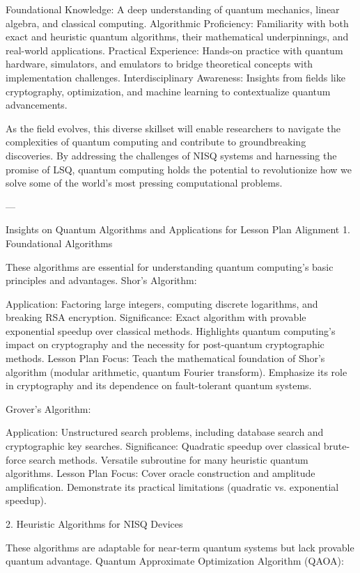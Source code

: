     Foundational Knowledge: A deep understanding of quantum mechanics, linear algebra, and classical computing.
    Algorithmic Proficiency: Familiarity with both exact and heuristic quantum algorithms, their mathematical underpinnings, and real-world applications.
    Practical Experience: Hands-on practice with quantum hardware, simulators, and emulators to bridge theoretical concepts with implementation challenges.
    Interdisciplinary Awareness: Insights from fields like cryptography, optimization, and machine learning to contextualize quantum advancements.

    As the field evolves, this diverse skillset will enable researchers to navigate the complexities of quantum computing and contribute to groundbreaking discoveries. By addressing the challenges of NISQ systems and harnessing the promise of LSQ, quantum computing holds the potential to revolutionize how we solve some of the world’s most pressing computational problems.


    ---

   Insights on Quantum Algorithms and Applications for Lesson Plan Alignment
1. Foundational Algorithms

These algorithms are essential for understanding quantum computing's basic principles and advantages.
Shor’s Algorithm:

    Application: Factoring large integers, computing discrete logarithms, and breaking RSA encryption.
    Significance:
        Exact algorithm with provable exponential speedup over classical methods.
        Highlights quantum computing’s impact on cryptography and the necessity for post-quantum cryptographic methods.
    Lesson Plan Focus:
        Teach the mathematical foundation of Shor’s algorithm (modular arithmetic, quantum Fourier transform).
        Emphasize its role in cryptography and its dependence on fault-tolerant quantum systems.

Grover’s Algorithm:

    Application: Unstructured search problems, including database search and cryptographic key searches.
    Significance:
        Quadratic speedup over classical brute-force search methods.
        Versatile subroutine for many heuristic quantum algorithms.
    Lesson Plan Focus:
        Cover oracle construction and amplitude amplification.
        Demonstrate its practical limitations (quadratic vs. exponential speedup).

2. Heuristic Algorithms for NISQ Devices

These algorithms are adaptable for near-term quantum systems but lack provable quantum advantage.
Quantum Approximate Optimization Algorithm (QAOA):

